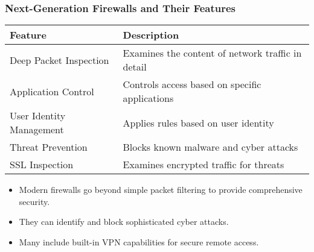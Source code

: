 \documentclass{beamer}
\begin{document}
\begin{frame}
    \frametitle{Next-Generation Firewalls and Their Features}
    
    \begin{tabular}{|p{}|p{}|}
        \hline
        \textbf{Feature} & \textbf{Description} \\
        \hline
        Deep Packet Inspection & Examines the content of network traffic in detail \\
        \hline
        Application Control & Controls access based on specific applications \\
        \hline
        User Identity Management & Applies rules based on user identity \\
        \hline
        Threat Prevention & Blocks known malware and cyber attacks \\
        \hline
        SSL Inspection & Examines encrypted traffic for threats \\
        \hline
    \end{tabular}
    
    \begin{itemize}
        \item Modern firewalls go beyond simple packet filtering to provide comprehensive security.
        \item They can identify and block sophisticated cyber attacks.
        \item Many include built-in VPN capabilities for secure remote access.
    \end{itemize}
\end{frame}
\end{document}
